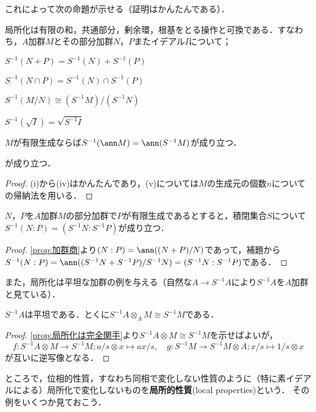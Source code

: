 これによって次の命題が示せる（証明はかんたんである）．
\begin{prop}\label{prop:局所化はいろんな操作と可換}
	局所化は有限の和，共通部分，剰余環，根基をとる操作と可換である．すなわち，$A$加群$M$とその部分加群$N，P$またイデアル$I$について；
	\begin{sakura}
		\item $S^{-1}(N+P)=S^{-1}(N)+S^{-1}(P)$
		\item $S^{-1}(N\cap P)=S^{-1}(N)\cap S^{-1}(P)$
		\item $S^{-1}(M/N)\cong (S^{-1}M)/(S^{-1}N)$
		\item $S^{-1}(\sqrt{I})=\sqrt{S^{-1}I}$
		\item $M$が有限生成ならば$S^{-1}(\ann M)=\ann(S^{-1}M)$が成り立つ．
	\end{sakura}
	が成り立つ．
\end{prop}
\begin{proof}
	(i)から(iv)はかんたんであり，(v)については$M$の生成元の個数$n$についての帰納法を用いる．
\end{proof}

\begin{cor}\label{prop:イデアル商は局所化と可換}
	$N，P$を$A$加群$M$の部分加群で$P$が有限生成であるとすると，積閉集合$S$について $S^{-1}(N:P)=(S^{-1}N:S^{-1}P)$が成り立つ．
\end{cor}
\begin{proof}	
	\ref{prop:加群商}より$(N:P)=\ann((N+P)/N)$であって，補題から$S^{-1}(N:P)=\ann ((S^{-1}N+S^{-1}P)/S^{-1}N)=(S^{-1}N:S^{-1}P)$である．	
\end{proof}

また，局所化は平坦な加群の例を与える（自然な$A\to S^{-1}A$により$S^{-1}A$を$A$加群と見ている）．
\begin{prop}
	$S^{-1}A$は平坦である．とくに$S^{-1}A\otimes_A M\cong S^{-1}M$である．
\end{prop}

\begin{proof}
	\ref{prop:局所化は完全関手}より$S^{-1}A\otimes M\cong S^{-1}M$を示せばよいが，	
	\[f:S^{-1}A\otimes M\to S^{-1}M;a/s\otimes x\mapsto ax/s,\quad g:S^{-1}M\to S^{-1}M\otimes A;x/s\mapsto 1/s\otimes x\]
	が互いに逆写像となる．
\end{proof}

ところで，位相的性質，すなわち同相で変化しない性質のように（特に素イデアルによる）局所化で変化しないものを\textbf{局所的性質}(local properties)という． その例をいくつか見ておこう．

